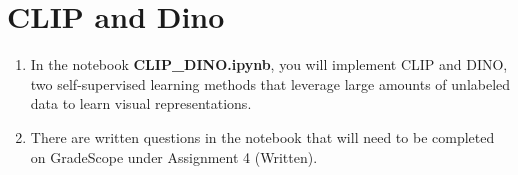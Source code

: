 \section{CLIP and Dino}

\begin{enumerate}
    \item {} In the notebook \textbf{CLIP\_DINO.ipynb}, you will implement CLIP and DINO, two self-supervised learning methods that leverage large amounts of unlabeled data to learn visual representations.
    \item {} There are written questions in the notebook that will need to be completed on GradeScope under Assignment 4 (Written).
\end{enumerate}